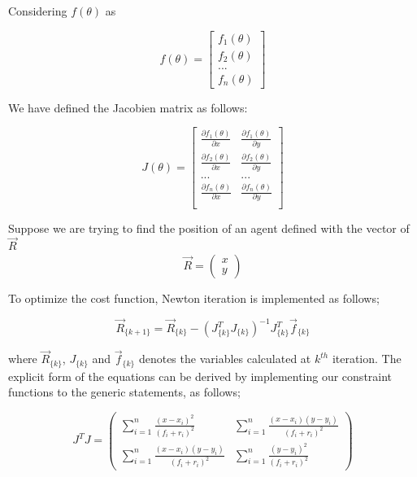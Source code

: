Considering  $f(\theta)$ as

\begin{equation}
f(\theta) = \begin{bmatrix}
f_1(\theta) \\
f_2(\theta) \\
...         \\
f_n(\theta)
\end{bmatrix}
\end{equation}


We have defined the Jacobien matrix as follows:

\begin{equation}
J(\theta) = \begin{bmatrix}
\frac{\partial{f_1(\theta)}}{\partial{x}} & \frac{\partial{f_1(\theta)}}{\partial{y}} \\
\frac{\partial{f_2(\theta)}}{\partial{x}} & \frac{\partial{f_2(\theta)}}{\partial{y}} \\
... & ... \\
\frac{\partial{f_n(\theta)}}{\partial{x}} & \frac{\partial{f_n(\theta)}}{\partial{y}} \\
\end{bmatrix}
\end{equation}

	
Suppose we are trying to find the position of an agent defined with the vector of $\vec{R}$	
\begin{equation}
 \vec{R} = \left(\begin{matrix}
  x \\ y 
 \end{matrix}\right)
\end{equation}

To optimize the cost function, Newton iteration is implemented as follows;

\begin{equation}
 \vec{R}_{\{k+1\}} =  \vec{R}_{\{k\}} - (J^T_{\{k\}}J_{\{k\}})^{-1}J^T_{\{k\}}\vec{f}_{\{k\}}
\end{equation}	

where $\vec{R}_{\{k\}}$, $J_{\{k\}}$ and $\vec{f}_{\{k\}}$ denotes the variables calculated at $k^{th}$ iteration. The explicit form of the equations can be derived  by implementing our constraint functions to the generic statements, as follows;
	
\begin{equation}
J^TJ = \left(\begin{matrix}
\sum_{i=1}^{n} \frac{(x-x_i)^2}{(f_i+r_i)^2} &  \sum_{i=1}^{n} \frac{(x-x_i)(y-y_i)}{(f_i+r_i)^2} \\
\sum_{i=1}^{n} \frac{(x-x_i)(y-y_i)}{(f_i+r_i)^2} &  \sum_{i=1}^{n} \frac{(y-y_i)^2}{(f_i+r_i)^2}
\end{matrix}\right)
\end{equation}	

